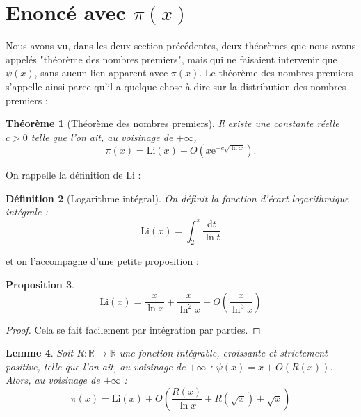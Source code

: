 \documentclass[french]{report}
\newtheorem{theorem}{Théorème}[section]
\newtheorem{definition}[theorem]{Définition}
\newtheorem{proposition}[theorem]{Proposition}
\newtheorem{lemma}[theorem]{Lemme}
\begin{document}
\section{Enoncé avec $\pi(x)$}

Nous avons vu, dans les deux section précédentes, deux théorèmes que nous avons appelés "théorème des nombres premiers", mais qui ne faisaient intervenir que $\psi(x)$, sans aucun lien apparent avec $\pi(x)$. Le théorème des nombres premiers s'appelle ainsi parce qu'il a quelque chose à dire sur la distribution des nombres premiers :

\begin{theorem}[Théorème des nombres premiers]\label{eq:tnp-pi-x}
  Il existe une constante réelle $c>0$ telle que l'on ait, au voisinage de $+\infty$,
  \[ \pi(x) = \mathrm{Li}(x) + O(x\mathrm{e}^{-c\sqrt{\ln x}}). \]
\end{theorem}

On rappelle la définition de $\mathrm{Li}$ :

\begin{definition}[Logarithme intégral] On définit la fonction d'écart logarithmique intégrale :
  \[
    \mathrm{Li}(x)
    = \int_2^x\frac{\mathrm{d}t}{\ln t}
  \]
\end{definition}

et on l'accompagne d'une petite proposition :

\begin{proposition}
  \[ \mathrm{Li}(x) = \frac{x}{\ln x} + \frac{x}{\ln^2 x} + O\left(\frac{x}{\ln^3 x} \right) \]
\end{proposition}

\begin{proof}
  Cela se fait facilement par intégration par parties.
\end{proof}

\begin{lemma}\label{lem:psi-x-r}
  Soit $R:\mathbb{R}\to\mathbb{R}$ une fonction intégrable, croissante et strictement positive, telle que l'on ait, au voisinage de $+\infty$ : $\psi(x)=x+O(R(x))$. Alors, au voisinage de $+\infty$ :
  \[
    \pi(x)
    = \mathrm{Li}(x)
    + O(\frac{R(x)}{\ln x} + R(\sqrt{x}) + \sqrt{x})
  \]
\end{lemma}
\end{document}
